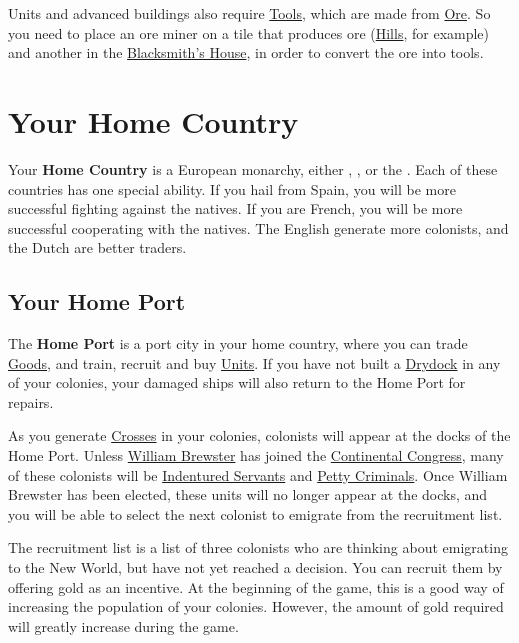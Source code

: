 \documentclass[12pt]{article}
\begin{document}
Units and advanced buildings also require \hyperlink{Tools}{Tools},
which are made from \hyperlink{Ore}{Ore}. So you need to place an ore
miner on a tile that produces ore (\hyperlink{Hills}{Hills}, for
example) and another in the \hyperlink{Blacksmith's
House}{Blacksmith's House}, in order to convert the ore into tools.



\hypertarget{Home Country}{\section{Your Home Country}}

Your \textbf{Home Country} is a European monarchy, either 
, ,  or the 
. Each of these countries has one
special ability. If you hail from Spain, you will be more successful
fighting against the natives. If you are French, you will be more
successful cooperating with the natives. The English generate more
colonists, and the Dutch are better traders.

\hypertarget{Home Port}{\subsection{Your Home Port}}

The \textbf{Home Port} is a port city in your home country, where you
can trade \hyperlink{Goods}{Goods}, and train, recruit and buy
\hyperlink{Units}{Units}. If you have not built a
\hyperlink{Drydock}{Drydock} in any of your colonies, your damaged
ships will also return to the Home Port for repairs.

As you generate \hyperlink{Crosses}{Crosses} in your colonies,
colonists will appear at the docks of the Home Port. Unless
\hyperlink{William Brewster}{William Brewster} has joined the
\hyperlink{Continental Congress}{Continental Congress}, many of these
colonists will be \hyperlink{Indentured Servant}{Indentured Servants}
and \hyperlink{Petty Criminal}{Petty Criminals}. Once William
Brewster has been elected, these units will no longer appear at the
docks, and you will be able to select the next colonist to emigrate
from the recruitment list.

The recruitment list is a list of three colonists who are thinking
about emigrating to the New World, but have not yet reached a
decision. You can recruit them by offering gold as an incentive. At
the beginning of the game, this is a good way of increasing the
population of your colonies. However, the amount of gold required will
greatly increase during the game.
\end{document}
